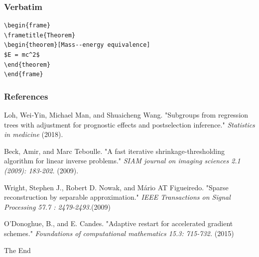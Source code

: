 \documentclass{beamer}
\begin{document}

\begin{frame}[fragile] %
\frametitle{Verbatim}
\begin{example}
\begin{verbatim}
\begin{frame}
\frametitle{Theorem}
\begin{theorem}[Mass--energy equivalence]
$E = mc^2$
\end{theorem}
\end{frame}\end{verbatim}
\end{example}
\end{frame}





\begin{frame}
\frametitle{References}
\footnotesize{
\begin{thebibliography}{99} %
 Loh, Wei‐Yin, Michael Man, and Shuaicheng Wang.  
\newblock "Subgroups from regression trees with adjustment for prognostic effects and postselection inference."
\newblock \emph{Statistics in medicine} (2018).

 Beck, Amir, and Marc Teboulle.
\newblock "A fast iterative shrinkage-thresholding algorithm for linear inverse problems."
\newblock \emph{ SIAM journal on imaging sciences 2.1 (2009): 183-202.  } (2009).

 Wright, Stephen J., Robert D. Nowak, and Mário AT Figueiredo.
 \newblock "Sparse reconstruction by separable approximation." 
\newblock \emph{IEEE Transactions on Signal Processing 57.7 : 2479-2493.}(2009)

 O’Donoghue, B., and E. Candes. 
\newblock  "Adaptive restart for accelerated gradient schemes." 
\newblock \emph{Foundations of computational mathematics 15.3: 715-732.} (2015)

\end{thebibliography}

}
\end{frame}


\begin{frame}
\Huge{\centerline{The End}}
\end{frame}

\end{document}
